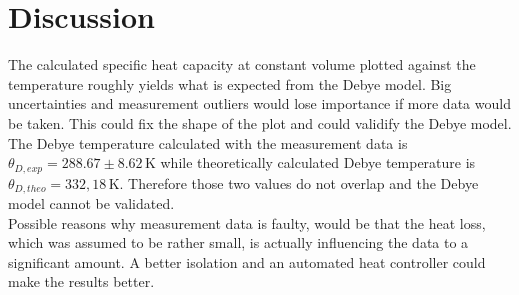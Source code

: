 \chapter{Discussion}
\label{cha:discussion}
The calculated specific heat capacity at constant volume plotted against the temperature roughly yields
what is expected from the Debye model. Big uncertainties and measurement outliers would lose importance 
if more data would be taken. This could fix the shape of the plot and could validify the Debye model.\\
The Debye temperature calculated with the measurement data is $\theta_{D,exp} =288.67 \pm 8.62 \, \unit{\kelvin}$ while theoretically
calculated Debye temperature is $\theta_{D,theo} = 332, 18 \, \unit{\kelvin}$. Therefore those two values do not
overlap and the Debye model cannot be validated. \\
Possible reasons why measurement data is faulty, would be that the heat loss, which was assumed to be rather
small, is actually influencing the data to a significant amount. A better isolation and an automated heat controller
could make the results better.